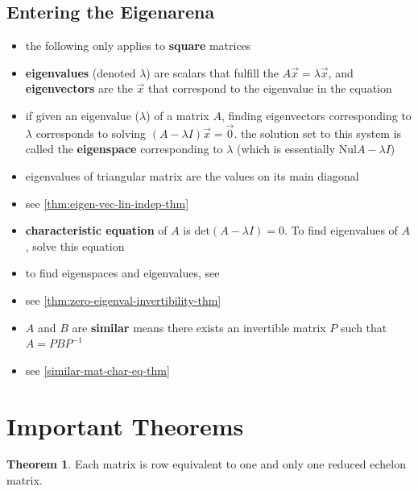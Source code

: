 \documentclass[a4paper,12pt]{article}
\theoremstyle{definition}
\newtheorem{theorem}{Theorem}
\theoremstyle{definition}
\newcommand{\mateq}[3]{#1#2 = #3}
\newcommand{\eigeneq}{\mateq{A}{\vec{x}}{\lambda\vec{x}}}
\newcommand{\chareq}{\text{det}(A - \lambda I) = 0}
\begin{document}
	\subsection{Entering the Eigenarena}
	\begin{itemize}
		\item the following only applies to \textbf{square} matrices
		
		\item \textbf{eigenvalues} (denoted $\lambda$) are scalars that fulfill the $\eigeneq$, and \textbf{eigenvectors} are the $\vec{x}$ that correspond to the eigenvalue in the equation
		
		\item if given an eigenvalue ($\lambda$) of a matrix $A$, finding eigenvectors corresponding to $\lambda$ corresponds to solving $(A - \lambda I)\vec{x} = \vec{0}$. the solution set to this system is called the \textbf{eigenspace} corresponding to $\lambda$ (which is essentially Nul$A - \lambda I$)
		
		\item eigenvalues of triangular matrix are the values on its main diagonal
		
		\item see \autoref{thm:eigen-vec-lin-indep-thm}
		
		\item \textbf{characteristic equation} of $A$ is $\chareq$. To find eigenvalues of $A$, solve this equation
		
		\item to find eigenspaces and eigenvalues, see 
		
		\item see \autoref{thm:zero-eigenval-invertibility-thm}
		
		\item $A$ and $B$ are \textbf{similar} means there exists an invertible matrix $P$ such that $A = PBP^{-1}$
		
		\item see \autoref{similar-mat-char-eq-thm}
	\end{itemize}
	\newpage
	
	\section{Important Theorems}
	\begin{theorem}
		Each matrix is row equivalent to one and only one reduced echelon matrix.
	\end{theorem}
	
\end{document}
